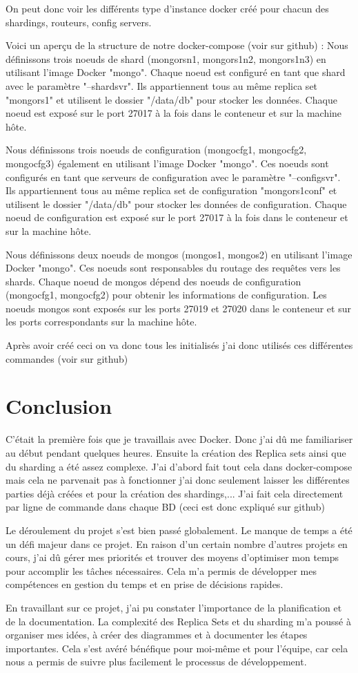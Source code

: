 On peut donc voir les différents type d'instance docker créé pour chacun des shardings, routeurs, config
servers.

Voici un aperçu de la structure de notre docker-compose (voir sur github) :
Nous définissons trois noeuds de shard (mongorsn1, mongors1n2, mongors1n3) en utilisant l'image
Docker "mongo". Chaque noeud est configuré en tant que shard avec le paramètre "--shardsvr". Ils
appartiennent tous au même replica set "mongors1" et utilisent le dossier "/data/db" pour stocker les
données. Chaque noeud est exposé sur le port 27017 à la fois dans le conteneur et sur la machine hôte.

Nous définissons trois noeuds de configuration (mongocfg1, mongocfg2, mongocfg3) également en
utilisant l'image Docker "mongo". Ces noeuds sont configurés en tant que serveurs de configuration
avec le paramètre "--configsvr". Ils appartiennent tous au même replica set de configuration
"mongors1conf" et utilisent le dossier "/data/db" pour stocker les données de configuration. Chaque
noeud de configuration est exposé sur le port 27017 à la fois dans le conteneur et sur la machine hôte.

Nous définissons deux noeuds de mongos (mongos1, mongos2) en utilisant l'image Docker "mongo".
Ces noeuds sont responsables du routage des requêtes vers les shards. Chaque noeud de mongos
dépend des noeuds de configuration (mongocfg1, mongocfg2) pour obtenir les informations de
configuration. Les noeuds mongos sont exposés sur les ports 27019 et 27020 dans le conteneur et sur
les ports correspondants sur la machine hôte.

Après avoir créé ceci on va donc tous les initialisés j'ai donc utilisés ces différentes commandes (voir sur
github)

\section{Conclusion}

C'était la première fois que je travaillais avec Docker. Donc j'ai dû me familiariser au début pendant
quelques heures. Ensuite la création des Replica sets ainsi que du sharding a été assez complexe. J'ai
d'abord fait tout cela dans docker-compose mais cela ne parvenait pas à fonctionner j'ai donc seulement
laisser les différentes parties déjà créées et pour la création des shardings,... J'ai fait cela directement
par ligne de commande dans chaque BD (ceci est donc expliqué sur github)

Le déroulement du projet s'est bien passé globalement. Le manque de temps a été un défi majeur dans
ce projet. En raison d'un certain nombre d'autres projets en cours, j'ai dû gérer mes priorités et trouver
des moyens d'optimiser mon temps pour accomplir les tâches nécessaires. Cela m'a permis de
développer mes compétences en gestion du temps et en prise de décisions rapides.

En travaillant sur ce projet, j'ai pu constater l'importance de la planification et de la documentation. La
complexité des Replica Sets et du sharding m'a poussé à organiser mes idées, à créer des diagrammes et
à documenter les étapes importantes. Cela s'est avéré bénéfique pour moi-même et pour l'équipe, car
cela nous a permis de suivre plus facilement le processus de développement.
